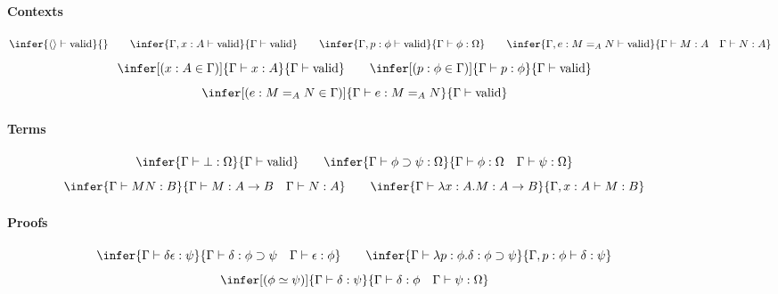 \documentclass[a4paper,UKenglish]{lipics-v2016}
\newcommand*{\vald}{\ensuremath{\vdash \mathrm{valid}}}
\theoremstyle{definition}
\begin{document}
\newcommand{\RvarT}{\ensuremath(\mathsf{varT})}
\begin{figure}
\begin{framed}
\paragraph{Contexts}
\[ \infer{\langle \rangle \vald}{} \qquad
\infer{\Gamma, x : A \vald}{\Gamma \vald} \qquad 
\infer{\Gamma, p : \phi \vald}{\Gamma \vdash \phi : \Omega} \qquad
\infer{\Gamma, e : M =_A N \vald}{\Gamma \vdash M : A \quad \Gamma \vdash N : A} \]
\[ \infer[(x : A \in \Gamma)]{\Gamma \vdash x : A}{\Gamma \vald} \qquad
\infer[(p : \phi \in \Gamma)]{\Gamma \vdash p : \phi}{\Gamma \vald} \]
\[ \infer[(e : M =_A N \in \Gamma)]{\Gamma \vdash e : M =_A N}{\Gamma \vald} \]

\paragraph{Terms}
\[ \infer{\Gamma \vdash \bot : \Omega}{\Gamma \vald} \qquad
\infer{\Gamma \vdash \phi \supset \psi : \Omega}{\Gamma \vdash \phi : \Omega \quad \Gamma \vdash \psi : \Omega} \]
\[ \infer{\Gamma \vdash M N : B} {\Gamma \vdash M : A \rightarrow B \quad \Gamma \vdash N : A} \qquad
\infer{\Gamma \vdash \lambda x:A.M : A \rightarrow B}{\Gamma, x : A \vdash M : B} \]

\paragraph{Proofs}
\[ \infer{\Gamma \vdash \delta \epsilon : \psi} {\Gamma \vdash \delta : \phi \supset \psi \quad \Gamma \vdash \epsilon : \phi} \qquad
\infer{\Gamma \vdash \lambda p : \phi . \delta : \phi \supset \psi}{\Gamma, p : \phi \vdash \delta : \psi} \]
\[ \infer[(\phi \simeq \psi)]{\Gamma \vdash \delta : \psi}{\Gamma \vdash \delta : \phi \quad \Gamma \vdash \psi : \Omega} \]


\end{framed}
\end{figure}
\end{document}
